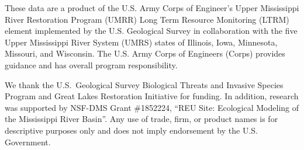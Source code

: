\documentclass[preprint,review,12pt,authoryear]{elsarticle}
\begin{document}
These data are a product of the U.S. Army Corps of Engineer's Upper Mississippi River Restoration Program (UMRR) Long Term Resource Monitoring (LTRM) element implemented by the U.S. Geological Survey in collaboration with the five Upper Mississippi River System (UMRS) states of Illinois, Iowa, Minnesota, Missouri, and Wisconsin.
The U.S. Army Corps of Engineers (Corps) provides guidance and has overall program responsibility.

We thank the U.S.~Geological Survey  Biological Threats and Invasive Species Program and Great Lakes Restoration Initiative for funding.
In addition, research was supported by NSF-DMS Grant \#1852224, ``REU Site: Ecological Modeling of the Mississippi River Basin''. Any use of trade, firm, or product names is for descriptive purposes only and does not imply endorsement by the U.S. Government.

  
 
\end{document}
